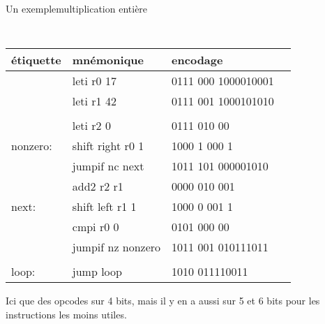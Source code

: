 \documentclass[slidetop,11pt,table]{beamer}
\begin{document}
\begin{frame}{Un exemple}{multiplication entière}
  \begin{center}
    \tt\small
    \begin{tabular}{llll}
    \textrm{étiquette} & \textrm{mnémonique} & \textrm{encodage}\\
    \hline
    
				 & leti	r0 17				 & 0111 000 1000010001 \\
				 & leti	r1 42				 & 0111 001 1000101010 \\
				 &									 &										 \\
				 & leti	r2 0				 & 0111 010 00				 \\
nonzero: & shift	right r0 1 & 1000 1 000 1				 \\
				 & jumpif	nc next		 & 1011 101 000001010	 \\
				 & add2	r2 r1				 & 0000 010 001				 \\
next:		 & shift	left r1 1	 & 1000 0 001 1				 \\
				 & cmpi	r0 0				 & 0101 000 00				 \\
				 & jumpif	nz nonzero & 1011 001 010111011	 \\
				 &									 &										 \\
loop:		 & jump	loop				 & 1010 011110011			 \\
  \end{tabular}
\end{center}
Ici que des opcodes sur 4 bits, mais il y en a aussi sur 5 et 6 bits pour les instructions les moins utiles.
\end{frame}
\end{document}
